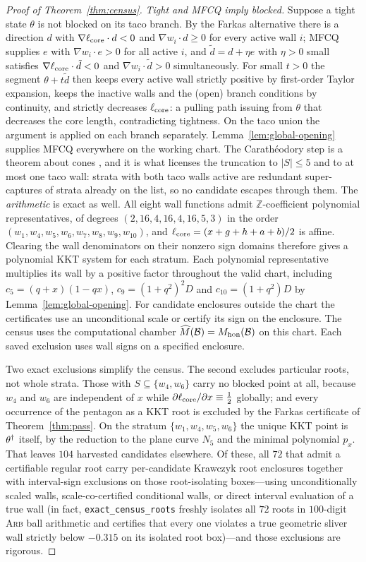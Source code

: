 \begin{proof}[Proof of Theorem~\textup{\ref{thm:census}}]
\emph{Tight and MFCQ imply blocked.} Suppose a tight state $\theta$ is not blocked on its taco branch. By the Farkas alternative there is a direction $d$ with $\nabla\ell_{\mathrm{core}}\cdot d<0$ and $\nabla w_i\cdot d\ge0$ for every active wall $i$; MFCQ supplies $e$ with $\nabla w_i\cdot e>0$ for all active $i$, and $\tilde d=d+\eta e$ with $\eta>0$ small satisfies $\nabla\ell_{\mathrm{core}}\cdot\tilde d<0$ and $\nabla w_i\cdot\tilde d>0$ simultaneously. For small $t>0$ the segment $\theta+t\tilde d$ then keeps every active wall strictly positive by first-order Taylor expansion, keeps the inactive walls and the (open) branch conditions by continuity, and strictly decreases $\ell_{\mathrm{core}}$: a pulling path issuing from $\theta$ that decreases the core length, contradicting tightness. On the taco union the argument is applied on each branch separately.
Lemma~\ref{lem:global-opening} supplies MFCQ everywhere on the working chart. The Carath\'eodory step is a theorem about cones \cite{barvinok2002}, and it is what licenses the truncation to $|S|\le5$ and to at most one taco wall: strata with both taco walls active are redundant super-captures of strata already on the list, so no candidate escapes through them. The \emph{arithmetic} is exact as well. All eight wall functions admit $\mathbb{Z}$-coefficient polynomial representatives, of degrees $(2,16,4,16,4,16,5,3)$ in the order $(w_1,w_4,w_5,w_6,w_7,w_8,w_9,w_{10})$, and $\ell_{\mathrm{core}}=(x+g+h+a+b)/2$ is affine. Clearing the wall denominators on their nonzero sign domains therefore gives a polynomial KKT system for each stratum. Each polynomial representative multiplies its wall by a positive factor throughout the valid chart, including $c_5=(q+x)(1-qx)$, $c_9=(1+q^2)^2D$ and $c_{10}=(1+q^2)D$ by Lemma~\ref{lem:global-opening}. For candidate enclosures outside the chart the certificates use an unconditional scale or certify its sign on the enclosure. The census uses the computational chamber $\widehat{M}(\mathcal{B})=M_{\mathrm{hon}}(\mathcal{B})$ on this chart. Each saved exclusion uses wall signs on a specified enclosure.

Two exact exclusions simplify the census. The second excludes particular roots, not whole strata. Those with $S\subseteq\{w_4,w_6\}$ carry no blocked point at all, because $w_4$ and $w_6$ are independent of $x$ while $\partial\ell_{\mathrm{core}}/\partial x\equiv\frac12$ globally; and every occurrence of the pentagon as a KKT root is excluded by the Farkas certificate of Theorem~\ref{thm:pass}. On the stratum $\{w_1,w_4,w_5,w_6\}$ the unique KKT point is $\theta^\dagger$ itself, by the reduction to the plane curve $N_5$ and the minimal polynomial $p_x$. That leaves $104$ harvested candidates elsewhere. Of these, all $72$ that admit a certifiable regular root carry per-candidate Krawczyk root enclosures together with interval-sign exclusions on those root-isolating boxes---using unconditionally scaled walls, scale-co-certified conditional walls, or direct interval evaluation of a true wall (in fact, \texttt{exact\_census\_roots} freshly isolates all $72$ roots in $100$-digit \textsc{Arb} ball arithmetic and certifies that every one violates a true geometric sliver wall strictly below $-0.315$ on its isolated root box)---and those exclusions are rigorous.


\end{proof}
